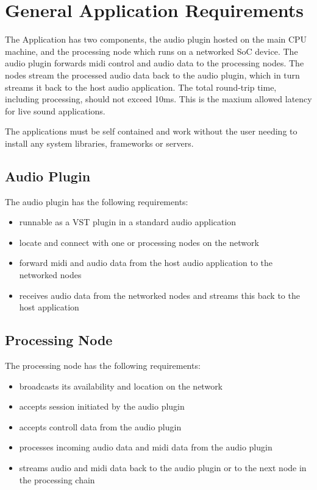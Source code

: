 \section{General Application Requirements}

The Application has two components, the audio plugin hosted on the main CPU machine, and the processing node which runs on a networked SoC device. The audio plugin forwards midi control and audio data to the processing nodes. The nodes stream the processed audio data back to the audio plugin, which in turn streams it back to the host audio application. The total round-trip time, including processing, should not exceed 10ms. This is the maxium allowed latency for live sound applications. \cite{AES67-2013}

The applications must be self contained and work without the user needing to install any system libraries, frameworks or servers.

\subsection{Audio Plugin}

The audio plugin has the following requirements:

\begin{itemize}

\item runnable as a VST plugin in a standard audio application
\item locate and connect with one or processing nodes on the network
\item forward midi and audio data from the host audio application to the networked nodes
\item receives audio data from the networked nodes and streams this back to the host application

\end{itemize}

\subsection{Processing Node}

The processing node has the following requirements:
\begin{itemize}

\item broadcasts its availability and location on the network
\item accepts session initiated by the audio plugin
\item accepts controll data from the audio plugin
\item processes incoming audio data and midi data from the audio plugin
\item streams audio and midi data back to the audio plugin or to the next node in the processing chain

\end{itemize}


